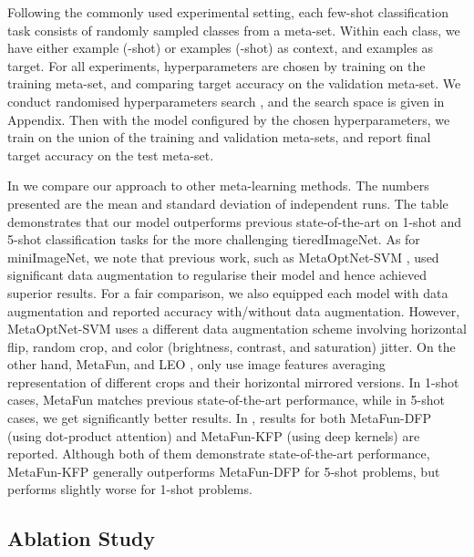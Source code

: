 \documentclass{article}
\theoremstyle{definition}
\begin{document}
Following the commonly used experimental setting, each few-shot classification task consists of  randomly sampled classes from a meta-set. Within each class, we have either  example (-shot) or  examples (-shot) as context, and  examples as target. For all experiments, hyperparameters are chosen by training on the training meta-set, and comparing target accuracy on the validation meta-set. We conduct randomised hyperparameters search \citep{bergstra2012random}, and the search space is given in Appendix. Then with the model configured by the chosen hyperparameters, we train on the union of the training and validation meta-sets, and report final target accuracy on the test meta-set. 

In  we compare our approach to other meta-learning methods. The numbers presented are the mean and standard deviation of  independent runs. The table demonstrates that our model outperforms previous state-of-the-art on 1-shot and 5-shot classification tasks for the more challenging tieredImageNet. 
As for miniImageNet, we note that previous work, such as MetaOptNet-SVM \citep{lee2019meta}, used significant data augmentation to regularise their model and hence achieved superior results. For a fair comparison, we also equipped each model with data augmentation and reported accuracy with/without data augmentation. 
However, MetaOptNet-SVM \citep{lee2019meta} uses a different data augmentation scheme involving horizontal flip, random crop, and color (brightness, contrast, and saturation) jitter. On the other hand, MetaFun, \citet{qiao2018few} and LEO \citep{rusu2018meta}, only use image features averaging representation of different crops and their horizontal mirrored versions.
In 1-shot cases, MetaFun matches previous state-of-the-art performance, while in 5-shot cases, we get significantly better results. In , results for both MetaFun-DFP (using dot-product attention) and MetaFun-KFP (using deep kernels) are reported. Although both of them demonstrate state-of-the-art performance, MetaFun-KFP generally outperforms MetaFun-DFP for 5-shot problems, but performs slightly worse for 1-shot problems.



\subsection{Ablation Study}
\end{document}
